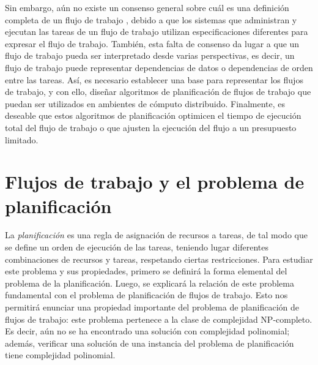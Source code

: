Sin embargo, aún no existe un consenso general sobre cuál es una definición completa de un flujo de trabajo \cite{van2003workflow}, debido a que los sistemas que administran y ejecutan las tareas de un flujo de trabajo utilizan especificaciones diferentes para expresar el flujo de trabajo. También, esta falta de consenso da lugar a que un flujo de trabajo pueda ser interpretado desde varias perspectivas, es decir, un flujo de trabajo puede representar dependencias de datos o dependencias de orden entre las tareas. Así, es necesario establecer una base para representar los flujos de trabajo, y con ello, diseñar algoritmos de planificación de flujos de trabajo que puedan ser utilizados en ambientes de cómputo distribuido. Finalmente, es deseable que estos algoritmos de planificación optimicen el tiempo de ejecución total del flujo de trabajo o que ajusten la ejecución del flujo a un presupuesto limitado.




\section{Flujos de trabajo y el problema de planificación} 
\label{secc:definitions}

La \emph{planificación} es una regla de asignación de recursos a tareas, de tal modo que se define un orden de ejecución de las tareas, teniendo lugar diferentes combinaciones de recursos y tareas, respetando ciertas restricciones. Para estudiar este problema y sus propiedades, primero se definirá la forma elemental del problema de la planificación. Luego, se explicará la relación de este problema fundamental con el problema de planificación de flujos de trabajo. Esto nos permitirá enunciar una propiedad importante del problema de planificación de flujos de trabajo: este problema pertenece a la clase de complejidad NP-completo. Es decir, aún no se ha encontrado una solución con complejidad polinomial; además, verificar una solución de una instancia del problema de planificación tiene complejidad polinomial.


